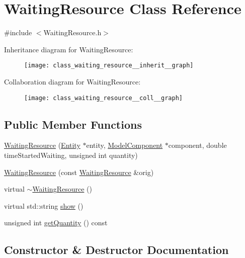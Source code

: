 \hypertarget{class_waiting_resource}{}\section{Waiting\+Resource Class Reference}
\label{class_waiting_resource}


{\ttfamily \#include $<$Waiting\+Resource.\+h$>$}



Inheritance diagram for Waiting\+Resource\+:\nopagebreak
\begin{figure}[H]
\begin{center}
\leavevmode
\texttt{[image: class\_waiting\_resource\_\_inherit\_\_graph]}
\end{center}
\end{figure}


Collaboration diagram for Waiting\+Resource\+:\nopagebreak
\begin{figure}[H]
\begin{center}
\leavevmode
\texttt{[image: class\_waiting\_resource\_\_coll\_\_graph]}
\end{center}
\end{figure}
\subsection*{Public Member Functions}
\begin{DoxyCompactItemize}
\item 
\hyperlink{class_waiting_resource_a845b5f09fb41f14f9d084f17094560d5}{Waiting\+Resource} (\hyperlink{class_entity}{Entity} $\ast$entity, \hyperlink{class_model_component}{Model\+Component} $\ast$component, double time\+Started\+Waiting, unsigned int quantity)
\item 
\hyperlink{class_waiting_resource_a7780ace7c4d94f544e7f894c5daaa2f8}{Waiting\+Resource} (const \hyperlink{class_waiting_resource}{Waiting\+Resource} \&orig)
\item 
virtual \hyperlink{class_waiting_resource_ac25ae06be17218e803d623fb1398aa8a}{$\sim$\+Waiting\+Resource} ()
\item 
virtual std\+::string \hyperlink{class_waiting_resource_afb0323a90d99b50d66de7f38d069b122}{show} ()
\item 
unsigned int \hyperlink{class_waiting_resource_a3a2be33ed8850145e393e8bf29c6c7ca}{get\+Quantity} () const 
\end{DoxyCompactItemize}


\subsection{Constructor \& Destructor Documentation}
